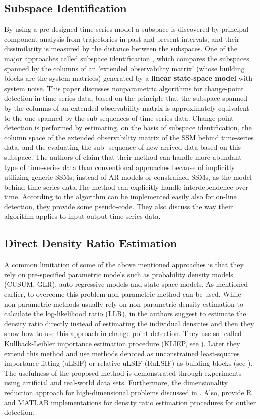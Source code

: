 \documentclass[conference,letterpaper]{IEEEtran}
\begin{document}
\subsection{Subspace Identification} \label{Subspace}
By using a pre-designed time-series model a subspace is discovered by principal component analysis from trajectories in past and present intervals, and their 
dissimilarity is measured by the distance between the subspaces. One of the major approaches called subspace identification \cite{KYM}, which compares the 
subspaces spanned by the columns of an 'extended observability matrix' (whose building blocks are the system matrices) generated by a {\bf linear state-space 
model} with system noise. This paper discusses nonparametric
algorithms for change-point detection in time-series data, based on the principle that the subspace spanned by the columns of an extended observability 
matrix is approximately equivalent to the one spanned by the sub-sequences of time-series data. Change-point detection is performed by estimating, on the 
basis of subspace identification, the column space of the extended observability matrix of the SSM behind time-series data, and the evaluating the sub-
sequence of new-arrived data based on this subspace. The authors of \cite{KYM} claim that their method can handle more abundant type of time-series data than 
conventional approaches because of implicitly utilizing generic SSMs, instead of AR models or constrained SSMs, as the model behind time series data.The 
method can explicitly handle interdependence over time. According to \cite{KYM} the algorithm can be implemented easily also for on-line detection, they 
provide some pseudo-code. They also discuss the way their algorithm applies to input-output time-series data.

\subsection{Direct Density Ratio Estimation} \label{DRE}
A common limitation of some of the above mentioned approaches is that they rely on pre-specified parametric models such as probability density models (CUSUM, 
GLR), auto-regressive models and state-space models. As mentioned earlier, to overcome this problem non-parametric method can be used. While non-parametric 
methods usually rely on non-parametric density estimation to calculate the log-likelihood ratio (LLR), in \cite{SUGI2012} the authors suggest to estimate the 
density ratio directly instead of estimating the individual densities and then they show how to use this approach in change-point detection. They use so-
called Kullback-Leibler importance estimation procedure (KLIEP, see \cite{KASU}). Later they extend this method and use methods denoted as
unconstrained least-squares importance fitting (uLSIF) or relative uLSIF (RuLSIF) as building blocks (see \cite{SUGI2012}). The usefulness of the proposed 
method is demonstrated through experiments using artificial and real-world data sets. Furthermore, the dimensionality reduction approach for high-dimensional 
problems discussed in \cite{YASU}. Also, \cite{SUGI2011} provide R and MATLAB implementations for density ratio estimation procedures for outlier detection. 
\end{document}
